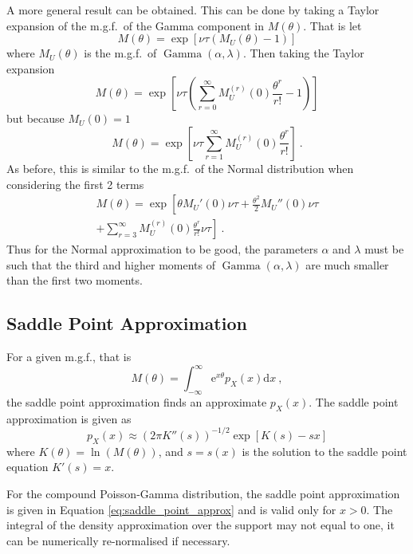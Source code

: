 \documentclass[a4paper]{proc}
\DeclareMathOperator{\gammaDist}{Gamma}
\newcommand{\euler}{\mathrm{e}}
\newcommand{\diff}{\mathrm{d}}
\begin{document}
A more general result can be obtained. This can be done by taking a Taylor expansion of the m.g.f.~of the Gamma component in $M(\theta)$. That is let
\begin{equation}
M(\theta)=\exp\left[
\nu\tau\left(M_U(\theta)-1\right)
\right]
\end{equation}
where $M_U(\theta)$ is the m.g.f.~of $\gammaDist(\alpha,\lambda)$. Then taking the Taylor expansion
\begin{equation*}
M(\theta)=\exp\left[
\nu\tau\left(
\sum_{r=0}^\infty M_U^{(r)}(0)\frac{\theta^r}{r!}
-1
\right)
\right]
\end{equation*}
but because $M_U(0)=1$
\begin{equation}
M(\theta)=\exp\left[
\nu\tau
\sum_{r=1}^\infty M_U^{(r)}(0)\frac{\theta^r}{r!}
\right] \ .
\end{equation}
As before, this is similar to the m.g.f.~of the Normal distribution when considering the first 2 terms
\begin{multline}
M(\theta)=\exp\left[
\theta M_U'(0)\nu\tau+\frac{\theta^2}{2} M_U''(0)\nu\tau
\right.\\\left.+
\sum_{r=3}^\infty M_U^{(r)}(0)\frac{\theta^r}{r!}\nu\tau\right] \ .
\end{multline}
Thus for the Normal approximation to be good, the parameters $\alpha$ and $\lambda$ must be such that the third and higher moments of $\gammaDist(\alpha,\lambda)$ are much smaller than the first two moments.

\subsection{Saddle Point Approximation}
For a given m.g.f., that is
\begin{equation}
M(\theta)=\int_{-\infty}^{\infty}\euler^{x\theta} p_X(x) \diff x \ ,
\end{equation}
the saddle point approximation \cite{daniels1954saddlepoint} \cite{butler2007saddlepoint} finds an approximate $p_X(x)$. The saddle point approximation is given as
\begin{equation}
p_X(x)\approx\left(2\pi K''(s)\right)^{-1/2}\exp\left[K(s)-sx\right]
\end{equation}
where $K(\theta) = \ln\left(M(\theta)\right)$, and $s=s(x)$ is the solution to the saddle point equation $K'(s)=x$.

For the compound Poisson-Gamma distribution, the saddle point approximation is given in Equation \eqref{eq:saddle_point_approx} and is valid only for $x>0$. The integral of the density approximation over the support may not equal to one, it can be numerically re-normalised if necessary.
\end{document}
